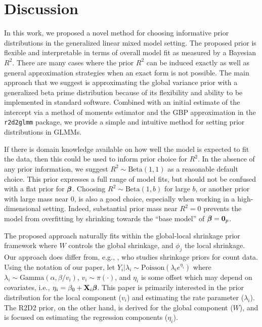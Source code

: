 \documentclass[12pt]{article}
\begin{document}
\section{Discussion}\label{s:discussion}

In this work, we proposed a novel method for choosing informative prior distributions in the generalized linear mixed model setting. The proposed prior is flexible and interpretable in terms of overall model fit as measured by a Bayesian $R^2$. There are many cases where the prior $R^2$ can be induced exactly as well as general approximation strategies when an exact form is not possible. The main approach that we suggest is approximating the global variance prior with a generalized beta prime distribution because of its flexibility and ability to be implemented in standard software. Combined with an initial estimate of the intercept via a method of moments estimator and the GBP approximation in the \texttt{r2d2glmm} package, we provide a simple and intuitive method for setting prior distributions in GLMMs.

If there is domain knowledge available on how well the model is expected to fit the data, then this could be used to inform prior choice for $R^2$.
In the absence of any prior information, we suggest $R^2\sim\mbox{Beta}(1,1)$ as a reasonable default choice. This prior expresses a full range of model fits, but should not be confused with a flat prior for $\mbox{\boldmath $\beta$}$. Choosing $R^2\sim\mbox{Beta}(1,b)$ for large $b$, or another prior with large mass near 0, is also a good choice, especially when working in a high-dimensional setting. Indeed, substantial prior mass near $R^2=0$ prevents the model from overfitting by shrinking towards the ``base model'' of $\mbox{\boldmath $\beta$}={\bf 0}_p$.

The proposed approach naturally fits within the global-local shrinkage prior framework where $W$ controls the global shrinkage, and $\phi_j$ the local shrinkage. Our approach does differ from, e.g., \cite{hamura2022global}, who studies shrinkage priors for count data. Using the notation of our paper, \cite{hamura2022global} let $Y_i|\lambda_i\sim\mbox{Poisson}(\lambda_i e^{\eta_i})$ where $\lambda_i\sim\mbox{Gamma}(\alpha,\beta/v_i)$, $v_i\sim\pi(\cdot)$, and $\eta_i$ is some offset which may depend on covariates, i.e., $\eta_i=\beta_0+\mbox{\bf X}_i\mbox{\boldmath $\beta$}$. This paper is primarily interested in the prior distribution for the local component ($v_i$) and estimating the rate parameter ($\lambda_i$). The R2D2 prior, on the other hand, is derived for the global component ($W$), and is focused on estimating the regression components ($\eta_i$).
\end{document}
